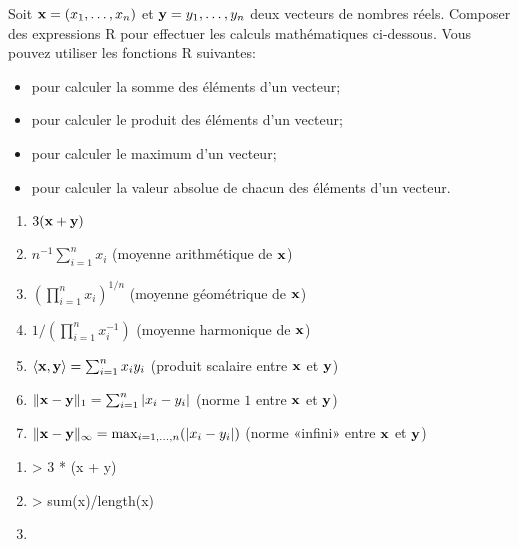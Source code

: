 \begin{exercice}
  Soit $\mathbf{x} = (x_1, \dots, x_n)$ et $\mathbf{y} = y_1, \dots, y_n$
  deux vecteurs de nombres réels. Composer des expressions R pour
  effectuer les calculs mathématiques ci-dessous. Vous pouvez utiliser
  les fonctions R suivantes:
  \begin{itemize}
  \item {} pour calculer la somme des éléments d'un
    vecteur;
  \item {} pour calculer le produit des éléments d'un
    vecteur;
  \item {} pour calculer le maximum d'un vecteur;
  \item {} pour calculer la valeur absolue de chacun des
    éléments d'un vecteur.
  \end{itemize}
  \begin{enumerate}
  \item $3 (\mathbf{x} + \mathbf{y})$
  \item $n^{-1} \sum_{i = 1}^n x_i$ (moyenne arithmétique de $\mathbf{x}$)
  \item $(\prod_{i = 1}^n x_i)^{1/n}$ (moyenne géométrique de $\mathbf{x}$)
  \item $1/(\prod_{i = 1}^n x_i^{-1})$ (moyenne harmonique de
    $\mathbf{x}$)
  \item $\langle \mathbf{x}, \mathbf{y} \rangle = \sum_{i = 1}^n x_i y_i$
    (produit scalaire entre $\mathbf{x}$ et $\mathbf{y}$)
  \item $\|\mathbf{x} - \mathbf{y}\|_1 = \sum_{i = 1}^n |x_i -
    y_i|$ (norme $1$ entre $\mathbf{x}$ et $\mathbf{y}$)
  \item $\|\mathbf{x} - \mathbf{y}\|_\infty = \max_{i = 1, \dots, n}(|x_i -
    y_i|)$ (norme «infini» entre $\mathbf{x}$ et $\mathbf{y}$)
  \end{enumerate}
  \begin{sol}
    \begin{enumerate}
    \item
\begin{Schunk}
\begin{Sinput}
> 3 * (x + y)
\end{Sinput}
\end{Schunk}
    \item
\begin{Schunk}
\begin{Sinput}
> sum(x)/length(x)
\end{Sinput}
\end{Schunk}
    \item

\end{enumerate}
\end{sol}
\end{exercice}
